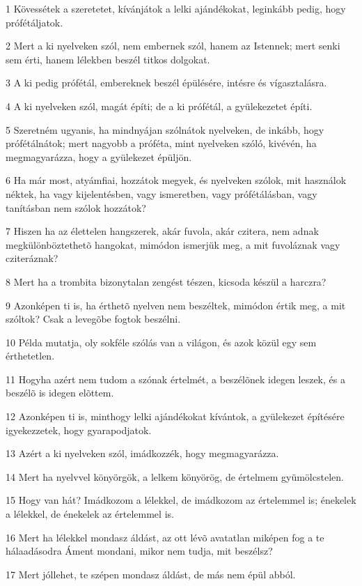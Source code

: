 \par 1 Kövessétek a szeretetet, kívánjátok a lelki ajándékokat, leginkább pedig, hogy  prófétáljatok.
\par 2 Mert a ki nyelveken szól, nem embernek szól, hanem az Istennek; mert senki sem érti, hanem lélekben beszél titkos dolgokat.
\par 3 A ki pedig prófétál, embereknek beszél épülésére, intésre és vígasztalásra.
\par 4 A ki nyelveken szól, magát építi; de a ki prófétál, a gyülekezetet építi.
\par 5 Szeretném ugyanis, ha mindnyájan szólnátok nyelveken, de inkább, hogy prófétálnátok; mert nagyobb a próféta, mint nyelveken szóló,  kivévén, ha megmagyarázza, hogy a gyülekezet épüljön.
\par 6 Ha már most, atyámfiai, hozzátok megyek, és nyelveken szólok, mit használok néktek, ha vagy kijelentésben, vagy ismeretben, vagy prófétálásban, vagy tanításban nem szólok hozzátok?
\par 7 Hiszen ha az élettelen hangszerek, akár fuvola, akár czitera, nem adnak megkülönböztethetõ hangokat, mimódon ismerjük meg, a mit fuvoláznak vagy cziteráznak?
\par 8 Mert ha a trombita bizonytalan zengést tészen, kicsoda készül a harczra?
\par 9 Azonképen ti is, ha érthetõ nyelven nem beszéltek, mimódon értik meg, a mit szóltok? Csak a levegõbe fogtok beszélni.
\par 10 Példa mutatja, oly sokféle szólás van a világon, és azok közül egy sem érthetetlen.
\par 11 Hogyha azért nem tudom a szónak értelmét, a beszélõnek idegen leszek, és a beszélõ is idegen elõttem.
\par 12 Azonképen ti is, minthogy lelki ajándékokat kívántok, a gyülekezet építésére igyekezzetek, hogy gyarapodjatok.
\par 13 Azért a ki nyelveken szól, imádkozzék, hogy megmagyarázza.
\par 14 Mert ha nyelvvel könyörgök, a lelkem könyörög, de értelmem gyümölcstelen.
\par 15 Hogy van hát? Imádkozom a lélekkel, de imádkozom az értelemmel is; énekelek a lélekkel, de énekelek az értelemmel is.
\par 16 Mert ha lélekkel mondasz áldást, az ott lévõ avatatlan miképen fog a te hálaadásodra Áment mondani, mikor nem tudja, mit beszélsz?
\par 17 Mert jóllehet, te szépen mondasz áldást, de más nem épül abból.
